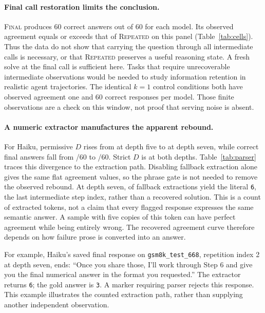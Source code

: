 \documentclass{article}
\newcommand{\fixed}{\textsc{Repeated}}
\newcommand{\finalonly}{\textsc{Final}}
\begin{document}



\paragraph{Final call restoration limits the conclusion.}
\finalonly{} produces 60 correct answers out of 60 for each model. Its observed agreement equals or exceeds that of \fixed{} on this panel (Table~\ref{tab:cells}). Thus the data do not show that carrying the question through all intermediate calls is necessary, or that \fixed{} preserves a useful reasoning state. A fresh solve at the final call is sufficient here. Tasks that require unrecoverable intermediate observations would be needed to study information retention in realistic agent trajectories. The identical $k=1$ control conditions both have observed agreement one and 60 correct responses per model. Those finite observations are a check on this window, not proof that serving noise is absent.

\paragraph{A numeric extractor manufactures the apparent rebound.}
For Haiku, permissive $D$ rises from \HaikuDfive{} at depth five to \HaikuDseven{} at depth seven, while correct final answers fall from \HaikuAccFiveCount{}/60 to \HaikuAccSevenCount{}/60. Strict $D$ is \HaikuStrictD{} at both depths. Table~\ref{tab:parser} traces this divergence to the extraction path. Disabling fallback extraction alone gives the same flat agreement values, so the phrase gate is not needed to remove the observed rebound. At depth seven, \StepCount{} of \FallbackCount{} fallback extractions yield the literal \texttt{6}, the last intermediate step index, rather than a recovered solution. This is a count of extracted tokens, not a claim that every flagged response expresses the same semantic answer. A sample with five copies of this token can have perfect agreement while being entirely wrong. The recovered agreement curve therefore depends on how failure prose is converted into an answer.

For example, Haiku's saved final response on \texttt{gsm8k\_test\_668}, repetition index 2 at depth seven, ends: ``Once you share those, I'll work through Step 6 and give you the final numerical answer in the format you requested.'' The extractor returns \texttt{6}; the gold answer is \texttt{3}. A marker requiring parser rejects this response. This example illustrates the counted extraction path, rather than supplying another independent observation.
\end{document}
